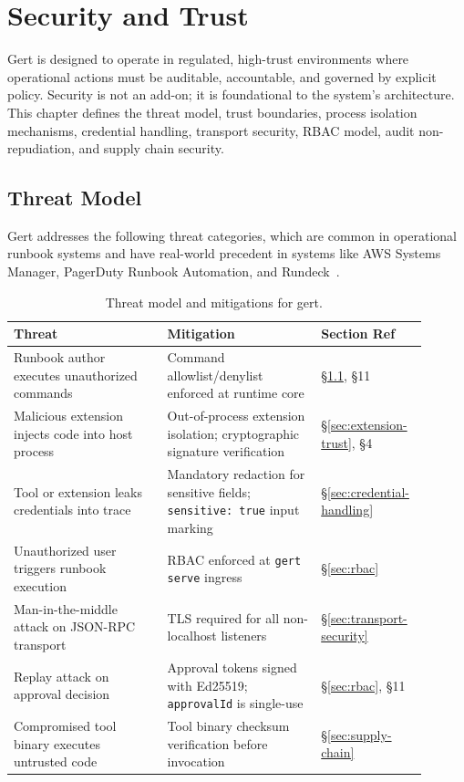 \chapter{Security and Trust}
\label{ch:security}

Gert is designed to operate in regulated, high-trust environments where
operational actions must be auditable, accountable, and governed by explicit
policy.  Security is not an add-on; it is foundational to the system's
architecture.  This chapter defines the threat model, trust boundaries,
process isolation mechanisms, credential handling, transport security, RBAC
model, audit non-repudiation, and supply chain security.

\section{Threat Model}
\label{sec:threat-model}

Gert addresses the following threat categories, which are common in
operational runbook systems and have real-world precedent in systems like AWS
Systems Manager, PagerDuty Runbook Automation, and Rundeck~\cite{aws-ssm-runbooks,pagerduty-automation,rundeck-docs}.

\begin{table}[ht]
\centering
\begin{tabular}{p{0.35\linewidth}p{0.35\linewidth}p{0.20\linewidth}}
\hline
\textbf{Threat} & \textbf{Mitigation} & \textbf{Section Ref} \\
\hline
Runbook author executes unauthorized commands &
Command allowlist/denylist enforced at runtime core &
§\ref{sec:threat-model}, §11 \\
\hline
Malicious extension injects code into host process &
Out-of-process extension isolation; cryptographic signature verification &
§\ref{sec:extension-trust}, §4 \\
\hline
Tool or extension leaks credentials into trace &
Mandatory redaction for sensitive fields; \texttt{sensitive: true} input marking &
§\ref{sec:credential-handling} \\
\hline
Unauthorized user triggers runbook execution &
RBAC enforced at \texttt{gert serve} ingress &
§\ref{sec:rbac} \\
\hline
Man-in-the-middle attack on JSON-RPC transport &
TLS required for all non-localhost listeners &
§\ref{sec:transport-security} \\
\hline
Replay attack on approval decision &
Approval tokens signed with Ed25519; \texttt{approvalId} is single-use &
§\ref{sec:rbac}, §11 \\
\hline
Compromised tool binary executes untrusted code &
Tool binary checksum verification before invocation &
§\ref{sec:supply-chain} \\
\hline
\end{tabular}
\caption{Threat model and mitigations for gert.}
\label{tab:threat-model}
\end{table}

